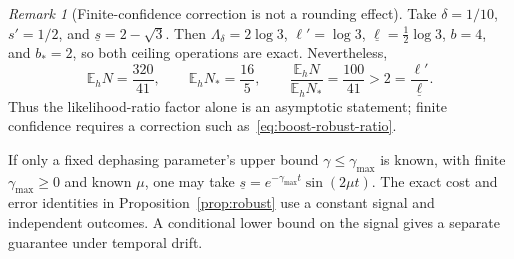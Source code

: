 \documentclass[11pt,a4paper]{article}
\newcommand{\E}{\mathbb E}
\theoremstyle{definition}
\theoremstyle{remark}
\newtheorem{remark}[theorem]{Remark}
\numberwithin{equation}{section}
\begin{document}
\begin{remark}[Finite-confidence correction is not a rounding effect]
Take $\delta=1/10$, $s'=1/2$, and $\underline s=2-\sqrt3$.
Then $\Lambda_\delta=2\log3$, $\ell'=\log3$,
$\underline\ell=\tfrac12\log3$, $b=4$, and $b_*=2$, so both ceiling
operations are exact. Nevertheless,
\begin{equation}\label{eq:boost-counterexample}
\E_hN=\frac{320}{41},\qquad
\E_hN_* =\frac{16}{5},\qquad
\frac{\E_hN}{\E_hN_*}=\frac{100}{41}
>2=\frac{\ell'}{\underline\ell}.
\end{equation}
Thus the likelihood-ratio factor alone is an asymptotic statement;
finite confidence requires a correction such as~\eqref{eq:boost-robust-ratio}.
\end{remark}

If only a fixed dephasing parameter's upper bound $\gamma\le\gamma_{\max}$
is known, with finite $\gamma_{\max}\ge0$ and known $\mu$, one may take
$\underline s=e^{-\gamma_{\max}t}\sin(2\mu t)$.
The exact cost and error identities in Proposition~\ref{prop:robust}
use a constant signal and independent outcomes. A conditional lower
bound on the signal gives a separate guarantee under temporal drift.
\end{document}
